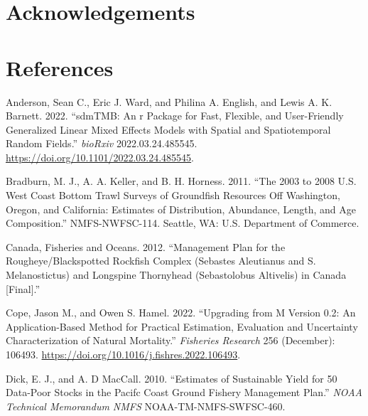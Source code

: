 \documentclass[
]{scrartcl}
\newlength{\cslhangindent}
\newenvironment{CSLReferences}[2] %
 {\begin{list}{}{%
  \setlength{\itemindent}{0pt}
  \setlength{\leftmargin}{0pt}
  \setlength{\parsep}{0pt}
  \ifodd #1
   \setlength{\leftmargin}{\cslhangindent}
   \setlength{\itemindent}{-1\cslhangindent}
  \fi
  \setlength{\itemsep}{#2\baselineskip}}}
 {\end{list}}
\begin{document}
\newpage{}

\newpage{}

\section{Acknowledgements}\label{sec-acknowledgements}

\newpage{}

\section{References}\label{references}

\label{refs}
\begin{CSLReferences}{1}{0}
Anderson, Sean C., Eric J. Ward, and Philina A. English, and Lewis A. K.
Barnett. 2022. {``{sdmTMB}: An r Package for Fast, Flexible, and
User-Friendly Generalized Linear Mixed Effects Models with Spatial and
Spatiotemporal Random Fields.''} \emph{bioRxiv} 2022.03.24.485545.
\url{https://doi.org/10.1101/2022.03.24.485545}.

Bradburn, M. J., A. A. Keller, and B. H. Horness. 2011. {``The 2003 to
2008 {U}.{S}. {W}est {C}oast Bottom Trawl Surveys of Groundfish
Resources Off {W}ashington, {O}regon, and {C}alifornia: Estimates of
Distribution, Abundance, Length, and Age Composition.''} NMFS-NWFSC-114.
Seattle, WA: {U}.{S}. Department of Commerce.

Canada, Fisheries and Oceans. 2012. {``Management {Plan} for the
{Rougheye}/{Blackspotted} {Rockfish} {Complex} ({Sebastes} Aleutianus
and {S}. Melanostictus) and {Longspine} {Thornyhead} ({Sebastolobus}
Altivelis) in {Canada} {[}{Final}{]}.''}

Cope, Jason M., and Owen S. Hamel. 2022. {``Upgrading from {M} Version
0.2: {An} Application-Based Method for Practical Estimation, Evaluation
and Uncertainty Characterization of Natural Mortality.''}
\emph{Fisheries Research} 256 (December): 106493.
\url{https://doi.org/10.1016/j.fishres.2022.106493}.

Dick, E. J., and A. D MacCall. 2010. {``Estimates of Sustainable Yield
for 50 Data-Poor Stocks in the {Pacifc} Coast Ground {Fishery}
{Management} {Plan}.''} \emph{NOAA Technical Memorandum NMFS}
NOAA-TM-NMFS-SWFSC-460.


\end{CSLReferences}
\end{document}
